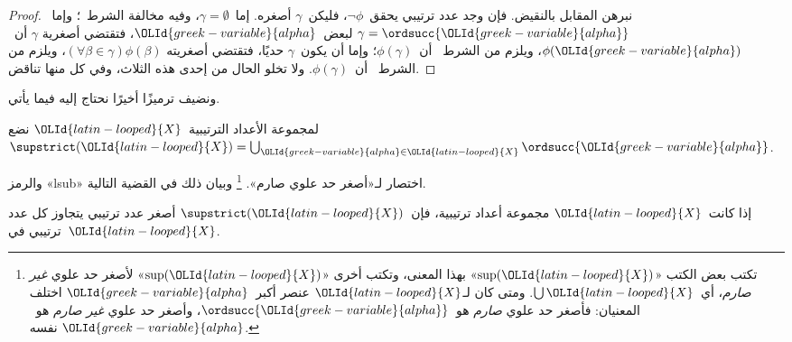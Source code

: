 \documentclass[../../../include/open-logic-section]{subfiles}
\begin{document}
\begin{proof}
نبرهن المقابل بالنقيض. فإن وجد عدد ترتيبي يحقق~$\lnot\phi$،
فليكن~$\gamma$ أصغره. إما~$\gamma = \emptyset$، وفيه مخالفة الشرط~؛
وإما~$\gamma = \ordsucc{{\OLId{greek-variable}{alpha}}}$ لبعض~${\OLId{greek-variable}{alpha}}$، فتقتضي أصغرية
$\gamma$ أن~$\phi({\OLId{greek-variable}{alpha}})$، ويلزم من الشرط~ أن~$\phi(\gamma)$؛
وإما أن يكون~$\gamma$ حديًا، فتقتضي أصغريته
$(\forall \beta \in \gamma)\phi(\beta)$، ويلزم من الشرط~ أن~$\phi(\gamma)$.
ولا تخلو الحال من إحدى هذه الثلاث، وفي كل منها تناقض.
\end{proof}
\noindent
ونضيف ترميزًا أخيرًا نحتاج إليه فيما يأتي.

\begin{defn}
لمجموعة الأعداد الترتيبية~${\OLId{latin-looped}{X}}$ نضع
$\supstrict({\OLId{latin-looped}{X}}) = \bigcup_{{\OLId{greek-variable}{alpha}} \in {\OLId{latin-looped}{X}}} \ordsucc{{\OLId{greek-variable}{alpha}}}$.
\end{defn}
\noindent
والرمز «lsub» اختصار لـ«أصغر حد علوي صارم».
\footnote{تكتب بعض الكتب «$\text{sup}({\OLId{latin-looped}{X}})$» بهذا المعنى، وتكتب أخرى
«$\text{sup}({\OLId{latin-looped}{X}})$» لأصغر حد علوي \emph{غير صارم}، أي~$\bigcup {\OLId{latin-looped}{X}}$.
ومتى كان لـ${\OLId{latin-looped}{X}}$ عنصر أكبر~${\OLId{greek-variable}{alpha}}$ اختلف المعنيان: فأصغر حد علوي
\emph{صارم} هو~$\ordsucc{{\OLId{greek-variable}{alpha}}}$، وأصغر حد علوي
\emph{غير صارم} هو~${\OLId{greek-variable}{alpha}}$ نفسه.}
وبيان ذلك في القضية التالية.

\begin{prop}
إذا كانت~${\OLId{latin-looped}{X}}$ مجموعة أعداد ترتيبية، فإن~$\supstrict({\OLId{latin-looped}{X}})$ أصغر عدد
ترتيبي يتجاوز كل عدد ترتيبي في~${\OLId{latin-looped}{X}}$.
\end{prop}
\end{document}
